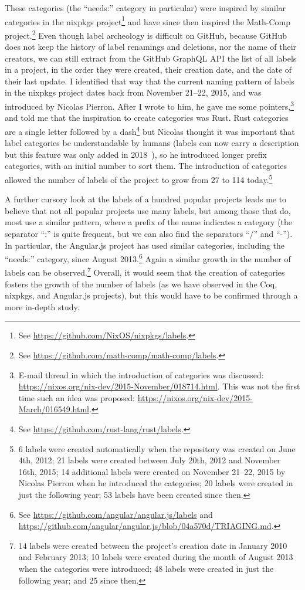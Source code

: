 These categories (the ``needs:'' category in particular) were inspired by similar categories in the nixpkgs project\footnote{
	See \url{https://github.com/NixOS/nixpkgs/labels}.
} and have since then inspired the Math-Comp project.\footnote{
	See \url{https://github.com/math-comp/math-comp/labels}.
}
Even though label archeology is difficult on GitHub, because GitHub does not keep the history of label renamings and deletions, nor the name of their creators, we can still extract from the GitHub GraphQL API the list of all labels in a project, in the order they were created, their creation date, and the date of their last update. I identified that way that the current naming pattern of labels in the nixpkgs project dates back from November 21--22, 2015, and was introduced by Nicolas Pierron. After I wrote to him, he gave me some pointers,\footnote{
	E-mail thread in which the introduction of categories was discussed: \url{https://nixos.org/nix-dev/2015-November/018714.html}.
	This was not the first time such an idea was proposed: \url{https://nixos.org/nix-dev/2015-March/016549.html}.
} and told me that the inspiration to create categories was Rust.
Rust categories are a single letter followed by a dash\footnote{
	See \url{https://github.com/rust-lang/rust/labels}.
}
but Nicolas thought it was important that label categories be understandable by humans (labels can now carry a description but this feature was only added in 2018~\cite{github_label_descriptions}), so he introduced longer prefix categories, with an initial number to sort them.
The introduction of categories allowed the number of labels of the project to grow from 27 to 114 today.\footnote{
	6 labels were created automatically when the repository was created on June 4th, 2012;
	21 labels were created between July 20th, 2012 and November 16th, 2015;
	14 additional labels were created on November 21--22, 2015 by Nicolas Pierron when he introduced the categories;
	20 labels were created in just the following year;
	53 labels have been created since then.
}

A further cursory look at the labels of a hundred popular projects leads me to believe that not all popular projects use many labels, but among those that do, most use a similar pattern, where a prefix of the name indicates a category (the separator ``:'' is quite frequent, but we can also find the separators ``/'' and ``-'').
In particular, the Angular.js project has used similar categories, including the ``needs:'' category, since August 2013.\footnote{
	See \url{https://github.com/angular/angular.js/labels} and \url{https://github.com/angular/angular.js/blob/04a570d/TRIAGING.md}.
}
Again a similar growth in the number of labels can be observed.\footnote{
	14 labels were created between the project's creation date in January 2010 and February 2013; 10 labels were created during the month of August 2013 when the categories were introduced; 48 labels were created in just the following year; and 25 since then.
}
Overall, it would seem that the creation of categories fosters the growth of the number of labels (as we have observed in the Coq, nixpkgs, and Angular.js projects), but this would have to be confirmed through a more in-depth study.

